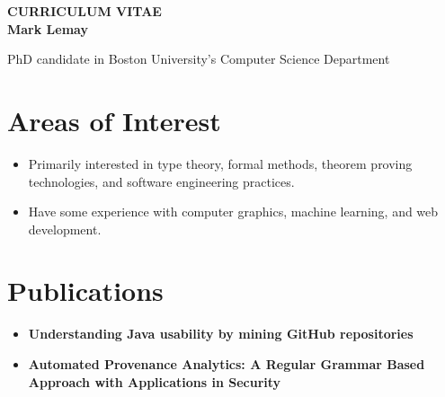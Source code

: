 
\begin{center}
{\LARGE {\bf CURRICULUM VITAE}}\\
\vspace{0.5in}
{\large {\bf Mark Lemay}}
\end{center}
PhD candidate in Boston University's Computer Science Department


\section*{Areas of Interest}
\begin{itemize}
  \item Primarily interested in type theory, formal methods, theorem proving technologies, and software engineering practices.
  \item Have some experience with computer graphics, machine learning, and web development.
\end{itemize}

\section*{Publications}
\begin{itemize}
  \item \textbf{Understanding Java usability by mining GitHub repositories}\cite{lemay2019understanding}
  \item \textbf{Automated Provenance Analytics: A Regular Grammar Based Approach with Applications in Security}\cite{lemay2017automated}
\end{itemize}

